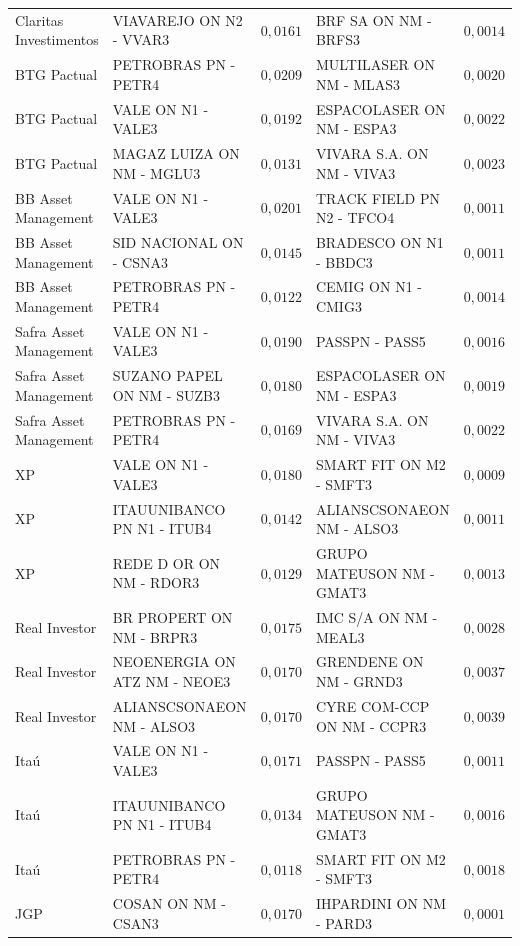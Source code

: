 \documentclass[11pt,a4paper]{article}
\begin{document}
\begin{center}
\begin{longtable}{@{}lp{3.9cm}rp{3.9cm}r@{}}
Claritas Investimentos & VIAVAREJO ON N2 - VVAR3 & $0{,}0161$ & BRF SA ON NM - BRFS3 & $0{,}0014$ \\
BTG Pactual & PETROBRAS PN - PETR4 & $0{,}0209$ & MULTILASER ON NM - MLAS3 & $0{,}0020$ \\
BTG Pactual & VALE ON N1 - VALE3 & $0{,}0192$ & ESPACOLASER ON NM - ESPA3 & $0{,}0022$ \\
BTG Pactual & MAGAZ LUIZA ON NM - MGLU3 & $0{,}0131$ & VIVARA S.A. ON NM - VIVA3 & $0{,}0023$ \\
BB Asset Management & VALE ON N1 - VALE3 & $0{,}0201$ & TRACK FIELD PN N2 - TFCO4 & $0{,}0011$ \\
BB Asset Management & SID NACIONAL ON - CSNA3 & $0{,}0145$ & BRADESCO ON N1 - BBDC3 & $0{,}0011$ \\
BB Asset Management & PETROBRAS PN - PETR4 & $0{,}0122$ & CEMIG ON N1 - CMIG3 & $0{,}0014$ \\
Safra Asset Management & VALE ON N1 - VALE3 & $0{,}0190$ & PASSPN - PASS5 & $0{,}0016$ \\
Safra Asset Management & SUZANO PAPEL ON NM - SUZB3 & $0{,}0180$ & ESPACOLASER ON NM - ESPA3 & $0{,}0019$ \\
Safra Asset Management & PETROBRAS PN - PETR4 & $0{,}0169$ & VIVARA S.A. ON NM - VIVA3 & $0{,}0022$ \\
XP & VALE ON N1 - VALE3 & $0{,}0180$ & SMART FIT ON M2 - SMFT3 & $0{,}0009$ \\
XP & ITAUUNIBANCO PN N1 - ITUB4 & $0{,}0142$ & ALIANSCSONAEON NM - ALSO3 & $0{,}0011$ \\
XP & REDE D OR ON NM - RDOR3 & $0{,}0129$ & GRUPO MATEUSON NM - GMAT3 & $0{,}0013$ \\
Real Investor & BR PROPERT ON NM - BRPR3 & $0{,}0175$ & IMC S/A ON NM - MEAL3 & $0{,}0028$ \\
Real Investor & NEOENERGIA ON ATZ NM - NEOE3 & $0{,}0170$ & GRENDENE ON NM - GRND3 & $0{,}0037$ \\
Real Investor & ALIANSCSONAEON NM - ALSO3 & $0{,}0170$ & CYRE COM-CCP ON NM - CCPR3 & $0{,}0039$ \\
Itaú & VALE ON N1 - VALE3 & $0{,}0171$ & PASSPN - PASS5 & $0{,}0011$ \\
Itaú & ITAUUNIBANCO PN N1 - ITUB4 & $0{,}0134$ & GRUPO MATEUSON NM - GMAT3 & $0{,}0016$ \\
Itaú & PETROBRAS PN - PETR4 & $0{,}0118$ & SMART FIT ON M2 - SMFT3 & $0{,}0018$ \\
JGP & COSAN ON NM - CSAN3 & $0{,}0170$ & IHPARDINI ON NM - PARD3 & $0{,}0001$ \\

\end{longtable}
\end{center}
\end{document}
